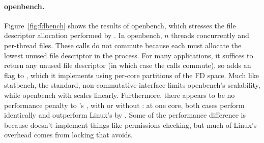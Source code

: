 \paragraph{openbench.} Figure~\ref{fig:fdbench} shows the results
of openbench, which stresses the file descriptor allocation performed by
.  In openbench, $n$ threads concurrently  and
 per-thread files.  These calls do not commute because each
 must allocate the lowest unused file
descriptor in the process.  For many applications, it suffices to return
any unused file descriptor (in which case the  calls commute),
so \sys adds an  flag to , which it implements
using per-core partitions of the FD space.  Much like
statbench, the standard, non-commutative  interface limits
openbench's scalability, while openbench with  scales
linearly.  Furthermore, there appears to be no performance penalty to
\fs's , with or without : at one core, both
cases perform identically and outperform Linux's  by
.
Some of the performance difference is because \sys doesn't implement things like
permissions checking, but much of Linux's overhead comes from locking
that \fs avoids.

%   

